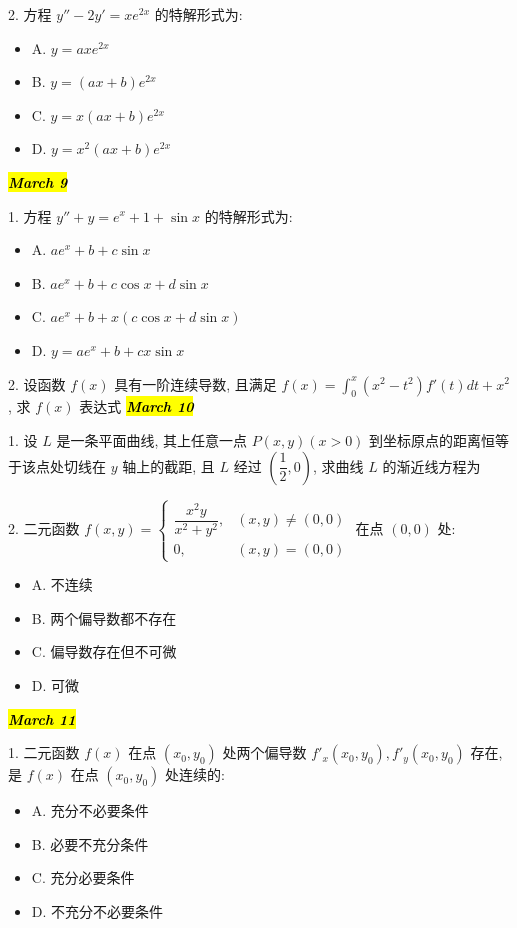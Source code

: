 2. 方程 $y''-2y'=xe^{2x}$ 的特解形式为:
\begin{itemize}
	\item A. $y=axe^{2x}$
	\item B. $y=(ax+b)e^{2x}$
	\item C. $y=x(ax+b)e^{2x}$
	\item D. $y=x^{2}(ax+b)e^{2x}$
\end{itemize}
\hl{\textbf{\textit{March 9}}}

1. 方程 $y''+y=e^{x}+1+\sin x$ 的特解形式为:
\begin{itemize}
	\item A. $ae^{x}+b+c\sin x$
	\item B. $ae^{x}+b+c\cos x+d\sin x$
	\item C. $ae^{x}+b+x(c\cos x+d\sin x)$
	\item D. $y=ae^{x}+b+cx\sin x$
\end{itemize}

2. 设函数 $f(x)$ 具有一阶连续导数, 且满足 $f(x)=\int_{0}^{x}(x^{2}-t^{2})f'(t)dt+x^{2}$, 求 $f(x)$ 表达式
\hl{\textbf{\textit{March 10}}}

1. 设 $L$ 是一条平面曲线, 其上任意一点 $P(x,y)(x>0)$ 到坐标原点的距离恒等于该点处切线在 $y$ 轴上的截距, 且 $L$ 经过 $(\dfrac{1}{2},0)$, 求曲线 $L$ 的渐近线方程为

2. 二元函数 $f(x,y)=
\begin{cases}
	\dfrac{x^{2}y}{x^{2}+y^{2}},&(x,y)\neq (0,0)\\
	0,&(x,y)=(0,0)
\end{cases}$ 在点 $(0,0)$ 处:
\begin{itemize}
	\item A. 不连续
	\item B. 两个偏导数都不存在
	\item C. 偏导数存在但不可微
	\item D. 可微
\end{itemize}
\hl{\textbf{\textit{March 11}}}

1. 二元函数 $f(x)$ 在点 $(x_{0},y_{0})$ 处两个偏导数 $f'_{x}(x_{0},y_{0}),f'_{y}(x_{0},y_{0})$ 存在, 是 $f(x)$ 在点 $(x_{0},y_{0})$ 处连续的:
\begin{itemize}
	\item A. 充分不必要条件
	\item B. 必要不充分条件
	\item C. 充分必要条件
	\item D. 不充分不必要条件
\end{itemize}

